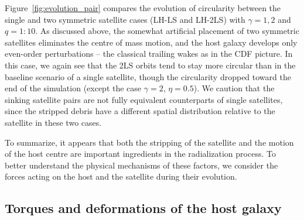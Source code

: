 \documentclass[twocolumn]{aastex63}
\newcommand{\LH}{\textsf{L\!H}\xspace}
\newcommand{\LS}{\textsf{L\!S}\xspace}
\begin{document}
Figure~\ref{fig:evolution_pair} compares the evolution of circularity between the single and two symmetric satellite cases (\LH-\LS and \LH-2\LS) with $\gamma=1,2$ and $q=1:10$. As discussed above, the somewhat artificial placement of two symmetric satellites eliminates the centre of mass motion, and the host galaxy develops only even-order perturbations -- the classical trailing wakes as in the CDF picture. In this case, we again see that the 2\LS orbits tend to stay more circular than in the baseline scenario of a single satellite, though the circularity dropped toward the end of the simulation (except the case $\gamma=2$, $\eta=0.5$). We caution that the sinking satellite pairs are not fully equivalent counterparts of single satellites, since the stripped debris have a different spatial distribution relative to the satellite in these two cases.

To summarize, it appears that both the stripping of the satellite and the motion of the host centre are important ingredients in the radialization process. To better understand the physical mechanisms of these factors, we consider the forces acting on the host and the satellite during their evolution.


\subsection{Torques and deformations of the host galaxy}  \label{sec:torques}
\end{document}
